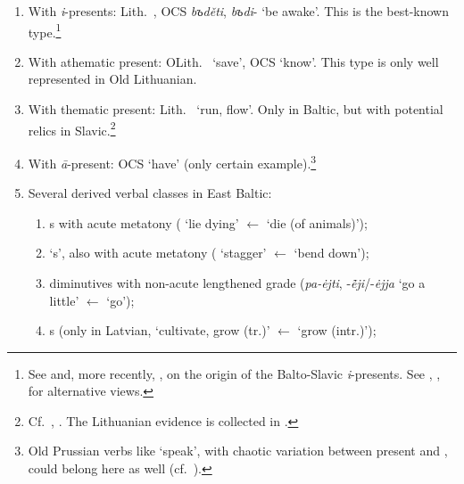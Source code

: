 \documentclass[output=paper,colorlinks,citecolor=brown]{langscibook}
\begin{document}
\begin{enumerate}
    \item With  \textit{i}-presents: Lith.\ , OCS \textit{bъděti}, \textit{bъdi}- ‘be awake’. This is the best-known type.\footnote{See \citet{Jasanoff2004} and, more recently, \citet{Yakubovich2014}, \citet{Grestenberger2019} on the origin of the Balto-Slavic \textit{i}-presents. See \citet[109--110]{Kortlandt1989}, \citet{Hardarson1998}, \citet[216--219]{Hill2016} for alternative views.}
    \item With athematic present: OLith.\  ‘save’, OCS  ‘know’. This type is only well represented in Old Lithuanian.
    \item With thematic present: Lith.\  ‘run, flow’. Only in Baltic, but with potential relics in Slavic.\footnote{Cf.\ \citet{Koelln1977}, \citet[470--473]{VillanuevaSvensson2017}. The Lithuanian evidence is collected in \citet{Jakulis2004}.}
    \item With \textit{ā}-present: OCS  ‘have’ (only certain example).\footnote{Old Prussian verbs like  ‘speak’, with chaotic variation between present  and , could belong here as well (cf.\ \citealt[187--204]{Kaukiene2004}).}
    \item Several derived verbal classes in East Baltic:
    \begin{enumerate}
        \item {}s with acute metatony ( ‘lie dying’ $\leftarrow$  ‘die (of animals)’);
        \item ‘s’, also with acute metatony ( ‘stagger’ $\leftarrow$  ‘bend down’); 
        \item diminutives with non-acute lengthened grade (\textit{pa-\.ejti}, -\textit{ė̃ji}/-\textit{\.ejja} ‘go a little’ $\leftarrow$  ‘go’); 
        \item {}s (only in Latvian,  ‘cultivate, grow (tr.)’ $\leftarrow$  ‘grow (intr.)’); 

\end{enumerate}
\end{enumerate}
\end{document}
